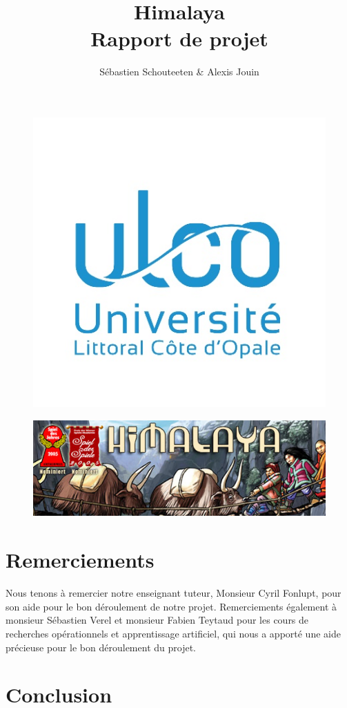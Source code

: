 \documentclass[french]{article}
\title{{\Huge Himalaya} \\ Rapport de projet}
\author{Sébastien Schouteeten \& Alexis Jouin}
\begin{document}
\begin{figure}
	\centering
	\includegraphics[width=0.5\linewidth]{images/ulco}
\end{figure}

\maketitle

\begin{figure}
	\centering
	\includegraphics[width=0.8\linewidth]{images/himalaya}
\end{figure}

\newpage

\tableofcontents

\newpage

\section{Remerciements}
Nous tenons à remercier notre enseignant tuteur, Monsieur Cyril Fonlupt, pour son aide pour le bon déroulement de notre projet. Remerciements également à monsieur Sébastien Verel et monsieur Fabien Teytaud pour les cours de recherches opérationnels et apprentissage artificiel, qui nous a apporté une aide précieuse pour le bon déroulement du projet.

\newpage



\newpage



\newpage



\newpage


\newpage
\section{Conclusion}

\newpage

\end{document}
